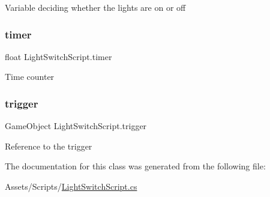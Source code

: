 Variable deciding whether the lights are on or off \mbox{\label{class_light_switch_script_abf98d3d80b24706721970aaed64ec0ea}} 
\subsubsection{\texorpdfstring{timer}{timer}}
{\footnotesize\ttfamily float Light\+Switch\+Script.\+timer\hspace{0.3cm}{\ttfamily [private]}}

Time counter \mbox{\label{class_light_switch_script_a826fecd2be8f45bf28b77389c2a7e3ef}} 
\subsubsection{\texorpdfstring{trigger}{trigger}}
{\footnotesize\ttfamily Game\+Object Light\+Switch\+Script.\+trigger}

Reference to the trigger 

The documentation for this class was generated from the following file\+:\begin{DoxyCompactItemize}
\item 
Assets/\+Scripts/\mbox{\hyperlink{_light_switch_script_8cs}{Light\+Switch\+Script.\+cs}}\end{DoxyCompactItemize}
